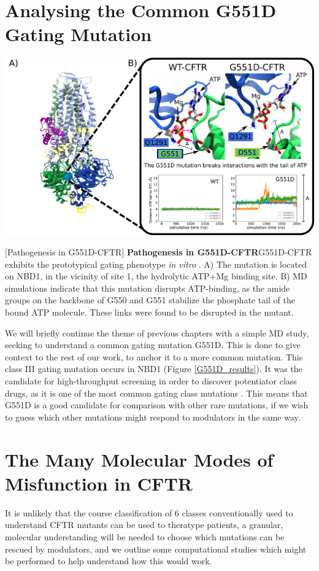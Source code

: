 \section{Analysing the Common G551D Gating Mutation}

	\begin{center}
		\includegraphics[width=\textwidth]{figures/perspective/G551D.pdf}
	\end{center}
\begingroup
\captionsetup{singlelinecheck = false, justification=raggedright}
[Pathogenesis in G551D-CFTR] {\textbf{Pathogenesis in G551D-CFTR}}{G551D-CFTR exhibits the prototypical gating phenotype \textit{in vitro} \cite{bompadre2007, wang2020}. A) The mutation is located on NBD1, in the vicinity of site 1, the hydrolytic ATP+Mg binding site. B) MD simulations indicate that this mutation disrupts ATP-binding, as the amide groups on the backbone of G550 and G551 stabilize the phosphate tail of the bound ATP molecule. These links were found to be disrupted in the mutant.} 
\label{G551D_results}
\endgroup

We will briefly continue the theme of previous chapters with a simple MD study, seeking to understand a common gating mutation G551D. This is done to give context to the rest of our work, to anchor it to a more common mutation. This class III gating mutation occurs in NBD1 (Figure \ref{G551D_results}). It was the candidate for high-throughput screening in order to discover potentiator class drugs, as it is one of the most common gating class mutations \cite{vangoor2009,li1996}. This means that G551D is a good candidate for comparison  with other rare mutations, if we wish to guess which other mutations might respond to modulators in the same way.

\section{The Many Molecular Modes of Misfunction in CFTR}
It is unlikely that the course classification of 6 classes conventionally used to understand CFTR mutants can be used to theratype patients, a granular, molecular understanding will be needed to choose which mutations can be rescued by modulators, and we outline some computational studies which might be performed to help understand how this would work.

